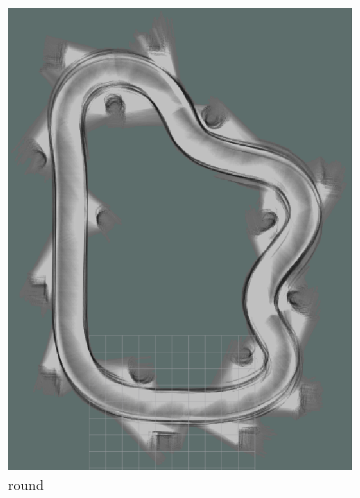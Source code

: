 \begin{figure}[H]
\begin{subfigure}{.3\linewidth}
		\includegraphics[width=\textwidth]{Pictures/2slamtest4}
		\caption{ round}
	\end{subfigure}
	\begin{subfigure}{.3\linewidth}

\end{subfigure}
\end{figure}
